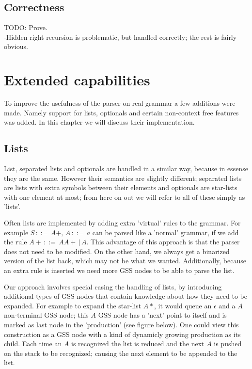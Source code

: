 \documentclass[a4paper,10pt]{article}
\begin{document}
\subsection{Correctness}

TODO: Prove.\\
-Hidden right recursion is problematic, but handled correctly; the rest is fairly obvious.

\section{Extended capabilities}

To improve the usefulness of the parser on real grammar a few additions were made. Namely support for lists, optionals and certain non-context free features was added. In this chapter we will discuss their implementation.

\subsection{Lists}

List, separated lists and optionals are handled in a similar way, because in essense they are the same. However their semantics are slightly different; separated lists are lists with extra symbols between their elements and optionals are star-lists with one element at most; from here on out we will refer to all of these simply as 'lists'.

Often lists are implemented by adding extra 'virtual' rules to the grammar. For example $S\,::=\,A+,\,A\,::=\,a$ can be parsed like a 'normal' grammar, if we add the rule $A+\,::=\,AA+\,|\,A$. This advantage of this approach is that the parser does not need to be modified. On the other hand, we always get a binarized version of the list back, which may not be what we wanted. Additionally, because an extra rule is inserted we need more GSS nodes to be able to parse the list.

Our approach involves special casing the handling of lists, by introducing additional types of GSS nodes that contain knowledge about how they need to be expanded. For example to expand the star-list $A*$, it would queue an $\epsilon$ and a $A$ non-terminal GSS node; this $A$ GSS node has a 'next' point to itself and is marked as last node in the 'production' (see figure below). One could view this construction as a GSS node with a kind of dynamicly growing production as its child. Each time an $A$ is recognized the list is reduced and the next $A$ is pushed on the stack to be recognized; causing the next element to be appended to the list.
\end{document}
